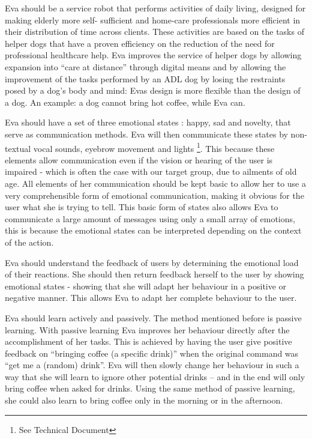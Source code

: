 \documentclass[project_eva.tex]{subfiles}
\begin{document}
Eva should be a service robot that performs activities of daily living, designed for making elderly more self-
sufficient\cite{Forlizzi} and home-care professionals more efficient in their distribution of time across clients. These 
activities are based on the tasks of helper dogs that have a proven efficiency on the reduction of the need for 
professional healthcare help\cite{Diepenhorst}. Eva improves the service of helper dogs by allowing 
expansion into ``care at distance'' \cite{Evers} through digital means and by allowing the improvement of the tasks 
performed by an ADL dog by losing the restraints posed by a dog’s body and mind: Eva\textquotesingle s design is more flexible than the 
design of a dog. An example: a dog cannot bring hot coffee, while Eva can.

Eva should have a set of three emotional states \pageref{sec:Emotion expression}: happy, sad and novelty, that serve as 
communication methods. Eva will then communicate these states by non-textual vocal sounds, eyebrow movement and lights 
\footnote{See Technical Document}. This because these elements allow communication even if the vision or hearing of the 
user is impaired - which is often the case with our target group, due to ailments of old age. All elements of her 
communication should be kept basic to allow her to use a very comprehensible form of emotional communication, making it 
obvious for the user what she is trying to tell. This basic form of states also allows Eva to communicate a large amount of messages using only a small array of emotions, this is because the emotional states can be interpreted depending on the context of the action.

Eva should understand the feedback of users by determining the emotional load of their reactions. She should then return 
feedback herself to the user by showing emotional states - showing that she will adapt her behaviour in a positive or 
negative manner. This allows Eva to adapt her complete behaviour to the user.

Eva should learn actively and passively. The method mentioned before is passive learning. With passive learning Eva 
improves her behaviour directly after the accomplishment of her tasks. This is achieved by having the user give positive feedback on ``bringing coffee (a specific drink)''  when the original command was ``get me a (random) drink''.  Eva will then slowly change her behaviour in such a way that she will learn to ignore other potential drinks – and in the end will only bring coffee when asked for drinks. Using the same method of passive learning, she could also learn to bring coffee only in the morning or in the afternoon.
\end{document}
